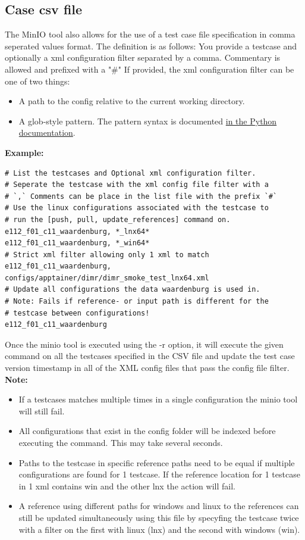 \documentclass{deltares_memo}
\begin{document}
\subsection{Case csv file}
\label{ssec:casefile}
The MinIO tool also allows for the use of a test case file specification in comma seperated values format.
The definition is as follows: You provide a testcase and optionally a xml configuration filter separated by a comma. Commentary is allowed and prefixed with a "\#"
If provided, the xml configuration filter can be one of two things:
\newline
\begin{itemize}
	\item A path to the config relative to the current working directory.
	\item A glob-style pattern. The pattern syntax is documented \href{https://docs.python.org/3/library/fnmatch.html#module-fnmatch}{in the Python documentation}.
\end{itemize}
\textbf{Example:}
\begin{verbatim}
# List the testcases and Optional xml configuration filter.
# Seperate the testcase with the xml config file filter with a 
# `,` Comments can be place in the list file with the prefix `#`
# Use the linux configurations associated with the testcase to 
# run the [push, pull, update_references] command on.
e112_f01_c11_waardenburg, *_lnx64*
e112_f01_c11_waardenburg, *_win64*
# Strict xml filter allowing only 1 xml to match
e112_f01_c11_waardenburg, configs/apptainer/dimr/dimr_smoke_test_lnx64.xml
# Update all configurations the data waardenburg is used in. 
# Note: Fails if reference- or input path is different for the 
# testcase between configurations!
e112_f01_c11_waardenburg
\end{verbatim}
Once the minio tool is executed using the -r option, it will execute the given command on all the testcases specified in the CSV file and update the test case version timestamp in all of the XML config files that pass the config file filter.
\newline
\textbf{Note:}
\begin{itemize}
\item If a testcases matches multiple times in a single configuration the minio tool will still fail.
\item All configurations that exist in the config folder will be indexed before executing the command. This may take several seconds.
\item Paths to the testcase in specific reference paths need to be equal if multiple configurations are found for 1 testcase. If the reference location for 1 testcase in 1 xml contains win and the other lnx the action will fail.
\item A reference using different paths for windows and linux to the references can still be updated simultaneously using this file by specyfing the testcase twice with a filter on the first with linux (lnx) and the second with windows (win).
\end{itemize}
\end{document}
